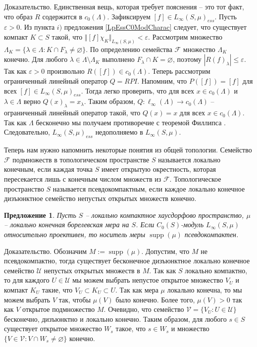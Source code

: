 \documentclass[12pt]{article}
\numberwithin{equation}{subsection}
\theoremstyle{plain}
\newtheorem{proposition}{Предложение}
\newenvironment{proof}{Доказательство.}{}
\begin{document}
\begin{fulltext}
\begin{proof}
        Единственная вещь, которая требует пояснения -- это тот факт, что образ $R$ содержится в $c_0(\Lambda)$. Зафиксируем $[f]\in L_\infty(S,\mu)_{ess}$. Пусть $\varepsilon>0$. Из пункта $i)$ предложения \ref{LpEssC0ModCharac} следует, что существует компакт $K\subset S$ такой, что $\Vert [f]\chi_{K}\Vert_{L_\infty(S,\mu)}<\varepsilon$. Рассмотрим множество $\Lambda_K=\{\lambda\in\Lambda: K\cap F_\lambda\neq\varnothing\}$. По определению семейства $\mathcal{F}$ множество $\Lambda_K$ конечно. Для любого $\lambda\in\Lambda\setminus \Lambda_K$ выполнено $F_\lambda\cap K=\varnothing$, поэтому $|R(f)_\lambda|\leq\varepsilon$. Так как $\varepsilon>0$ произвольно $R([f])\in c_0(\Lambda)$. Теперь рассмотрим ограниченный линейный оператор $Q=RPI$. Напомним, что $P([f])=[f]$ для всех $[f]\in L_\infty(S,\mu)_{ess}$. Тогда легко проверить, что для всех $x\in c_0(\Lambda)$ и $\lambda\in\Lambda$ верно $Q(x)_\lambda=x_\lambda$. Таким образом, $Q:\ell_\infty(\Lambda)\to c_0(\Lambda)$ -- ограниченный линейный оператор такой, что $Q(x)=x$ для всех $x\in c_0(\Lambda)$. Так как $\Lambda$ бесконечно мы получаем противоречие с теоремой Филлипса \cite{PhilOnLinTran}. Следовательно, $L_\infty(S,\mu)_{ess}$ недополняемо в $L_\infty(S,\mu)$.
    \end{proof}

    Теперь нам нужно напомнить некоторые понятия из общей топологии. Семейство $\mathcal{F}$ подмножеств в топологическом пространстве $S$ называется локально конечным, если каждая точка $S$ имеет открытую окрестность, которая пересекается лишь с конечным числом множеств из $\mathcal{F}$. Топологическое пространство $S$ называется псевдокомпактным, если каждое локально конечное дизъюнктное семейство непустых открытых множеств конечно.

    \begin{proposition}\label{LInfRelProjSuppCond} Пусть $S$ -- локально компактное хаусдорфово пространст\-во, $\mu$ -- локально конечная борелевская мера на $S$. Если $C_0(S)$-модуль $L_\infty(S,\mu)$ относительно проективен, то носитель меры $\operatorname{supp}(\mu)$ псевдокомпактен.
    \end{proposition}
    \begin{proof} Обозначим $M:=\operatorname{supp}(\mu)$. Допустим, что $M$ не псевдокомпактно, тогда существует бесконечное дизъюнктное локально конечное семейство $\mathcal{U}$ непустых открытых множеств в $M$. Так как $S$ локально компактно, то для каждого $U\in\mathcal{U}$ мы можем выбрать непустое открытое множество $V_U$ и компакт $K_U$ такие, что $V_U\subset K_U\subset  U$. Так как мера $\mu$ локально конечна, то мы можем выбрать $V$ так, чтобы $\mu(V)$ было конечно. Более того, $\mu(V)>0$ так как $V$ открытое подмножество $M$. Очевидно, что семейство $\mathcal{V}=\{V_U:U\in\mathcal{U}\}$ бесконечно, дизъюнктно и локально конечно. Таким образом, для любого $s\in S$ существует открытое множество $W_s$ такое, что $s\in W_s$ и множество $\{V\in\mathcal{V}: V\cap W_s\neq\varnothing\}$ конечно.


\end{proof}
\end{fulltext}
\end{document}
